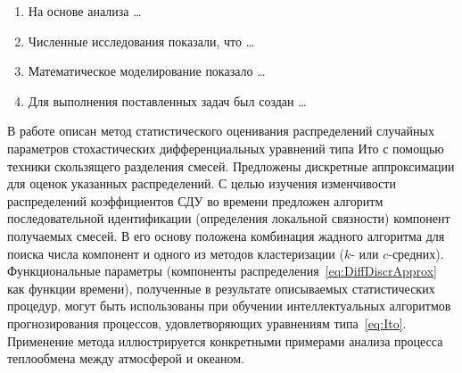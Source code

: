 \begin{enumerate}
  \item На основе анализа \ldots
  \item Численные исследования показали, что \ldots
  \item Математическое моделирование показало \ldots
  \item Для выполнения поставленных задач был создан \ldots
\end{enumerate}

В работе описан метод статистического оценивания распределений случайных параметров стохастических дифференциальных уравнений типа Ито с помощью техники скользящего разделения смесей. Предложены дискретные аппроксимации для оценок указанных распределений. С целью изучения изменчивости распределений коэффициентов СДУ во времени предложен алгоритм последовательной идентификации (определения локальной связности) компонент получаемых смесей. В его основу положена комбинация жадного алгоритма для поиска числа компонент и одного из методов кластеризации ($k$- или $c$-средних). Функциональные параметры (компоненты распределения~\eqref{eq:DiffDiscrApprox} как функции времени), полученные в результате описываемых статистических процедур, могут быть использованы при обучении интеллектуальных алгоритмов прогнозирования процессов, удовлетворяющих уравнениям типа~\eqref{eq:Ito}. Применение метода иллюстрируется конкретными примерами анализа процесса теплообмена между атмосферой и океаном.